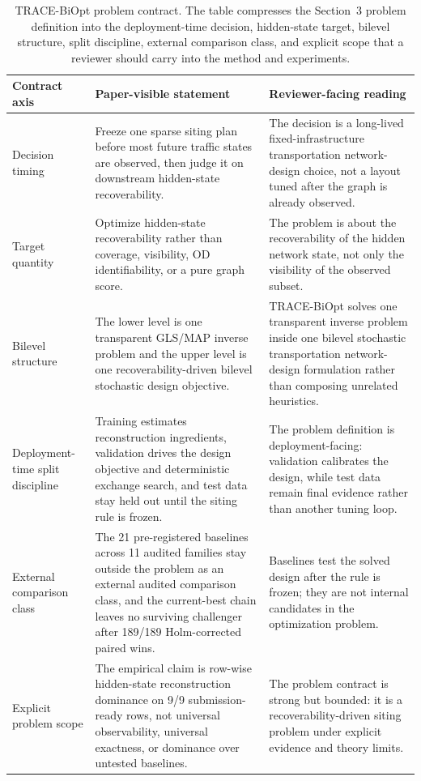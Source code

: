 \begin{table}[pos=htbp]
\centering
\caption{TRACE-BiOpt problem contract. The table compresses the Section~3 problem definition into the deployment-time decision, hidden-state target, bilevel structure, split discipline, external comparison class, and explicit scope that a reviewer should carry into the method and experiments.}
\label{tab:trace-biopt-problem-contract}
\small
\begin{tabularx}{\textwidth}{>{\raggedright\arraybackslash}p{}>{\raggedright\arraybackslash}p{}>{\raggedright\arraybackslash}X}
\toprule
Contract axis & Paper-visible statement & Reviewer-facing reading \\
\midrule
Decision timing & Freeze one sparse siting plan before most future traffic states are observed, then judge it on downstream hidden-state recoverability. & The decision is a long-lived fixed-infrastructure transportation network-design choice, not a layout tuned after the graph is already observed. \\
Target quantity & Optimize hidden-state recoverability rather than coverage, visibility, OD identifiability, or a pure graph score. & The problem is about the recoverability of the hidden network state, not only the visibility of the observed subset. \\
Bilevel structure & The lower level is one transparent GLS/MAP inverse problem and the upper level is one recoverability-driven bilevel stochastic design objective. & TRACE-BiOpt solves one transparent inverse problem inside one bilevel stochastic transportation network-design formulation rather than composing unrelated heuristics. \\
Deployment-time split discipline & Training estimates reconstruction ingredients, validation drives the design objective and deterministic exchange search, and test data stay held out until the siting rule is frozen. & The problem definition is deployment-facing: validation calibrates the design, while test data remain final evidence rather than another tuning loop. \\
External comparison class & The 21 pre-registered baselines across 11 audited families stay outside the problem as an external audited comparison class, and the current-best chain leaves no surviving challenger after 189/189 Holm-corrected paired wins. & Baselines test the solved design after the rule is frozen; they are not internal candidates in the optimization problem. \\
Explicit problem scope & The empirical claim is row-wise hidden-state reconstruction dominance on 9/9 submission-ready rows, not universal observability, universal exactness, or dominance over untested baselines. & The problem contract is strong but bounded: it is a recoverability-driven siting problem under explicit evidence and theory limits. \\
\bottomrule
\end{tabularx}
\end{table}
